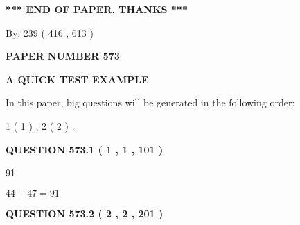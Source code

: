 \documentclass[12pt]{article}
\begin{document}
 
 
 
   
   
 \vspace{0.2in}
 
   
   
   
   
\vspace{1.0in} 
{\textbf{\large{ *** END OF PAPER, THANKS *** }}} 
   
   
\hspace{1.0in} By: 
 239 ( 416 ,  613 )
   
   
   
   
\newpage 
\setcounter{page}{ 
   573001 } 
   
   
   
   
 {\textbf{ \Large{ PAPER NUMBER  573  }}}
   
   
\vspace{0.2in}
   
   
   
   
   
   
 \vspace{0.2in}
{\LARGE {\textbf{ A QUICK TEST EXAMPLE}}}
   
   
   
\vspace{0.2in}
   
In this paper, big questions will be generated in the following order: 
   
   
   1 ( 1 )
 ,
   2 ( 2 )
 .
  
\vspace{0.2in}
  
{\textbf{\Large{QUESTION
573.1 
 ( 1 , 1 , 101 )
}}}
  
  
 
 
\noindent{}

91
 
 
 
 
\noindent{}

$ %
44 +  %
47=   %
91$
 
 
  
\vspace{0.2in}
  
{\textbf{\Large{QUESTION
573.2 
 ( 2 , 2 , 201 )
}}}
  
\end{document}
